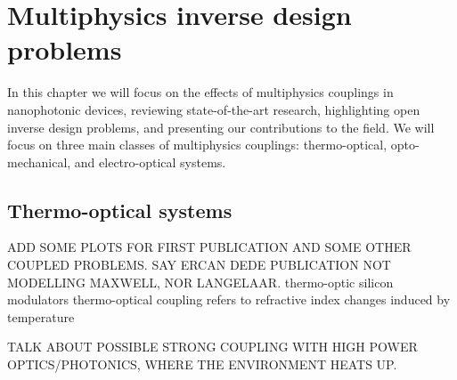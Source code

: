 \chapter{Multiphysics inverse design problems}

In this chapter we will focus on the effects of multiphysics couplings in nanophotonic devices, reviewing state-of-the-art research, 
highlighting open inverse design problems, and presenting our contributions to the field.
We will focus on three main classes of multiphysics couplings: thermo-optical, opto-mechanical, and electro-optical systems.








\section{Thermo-optical systems~\cite{ownpub0,ownpub4}}

ADD SOME PLOTS FOR FIRST PUBLICATION AND SOME OTHER COUPLED PROBLEMS.
SAY ERCAN DEDE PUBLICATION NOT MODELLING MAXWELL, NOR LANGELAAR. %
thermo-optic silicon modulators
thermo-optical coupling refers to refractive index changes induced by temperature

TALK ABOUT POSSIBLE STRONG COUPLING WITH HIGH POWER OPTICS/PHOTONICS, WHERE THE ENVIRONMENT HEATS UP.

